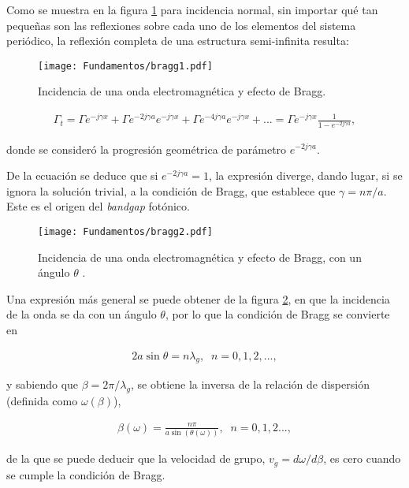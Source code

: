Como se muestra en la figura \ref{fig:bragg-dibujo} para incidencia normal, sin importar qué tan pequeñas son las reflexiones sobre cada uno de los elementos del sistema periódico, la reflexión completa de una estructura semi-infinita resulta:

\begin{figure}[htp]
	\centering
	\texttt{[image: Fundamentos/bragg1.pdf]}
	\caption{Incidencia de una onda electromagnética y efecto de Bragg.}
	\label{fig:bragg-dibujo}
\end{figure}

\begin{align}
	\Gamma_t = \Gamma e^{-j\gamma x} + \Gamma e^{-2j\gamma a} e^{-j\gamma x} + \Gamma e^{-4j\gamma a} e^{-j\gamma x} + ... = \Gamma e^{-j\gamma x} \frac{1}{1-e^{-2j\gamma a}},
\end{align}

donde se consideró la progresión geométrica de parámetro $e^{-2j\gamma a}$.

De la ecuación se deduce que si $e^{-2j\gamma a} = 1$, la expresión diverge, dando lugar, si se ignora la solución trivial, a la condición de Bragg, que establece que $\gamma = n\pi/a$. Este es el origen del \textit{bandgap} fotónico.

\begin{figure}[htp]
	\centering
	\texttt{[image: Fundamentos/bragg2.pdf]}
	\caption{Incidencia de una onda electromagnética y efecto de Bragg, con un ángulo $\theta$ \cite{Caloz:ElectromagneticMetamaterials}.}
	\label{fig:bragg2}
\end{figure}

Una expresión más general se puede obtener de la figura \ref{fig:bragg2}, en que la incidencia de la onda se da con un ángulo $\theta$, por lo que la condición de Bragg se convierte en

\begin{align}
	2 a \sin\theta = n \lambda_g, \;\; n=0, 1, 2, ...,
\end{align}

y sabiendo que $\beta = 2\pi/\lambda_g$, se obtiene la inversa de la relación de dispersión (definida como $\omega(\beta)$),

\begin{align}
	\beta(\omega) = \frac{n\pi}{a \sin(\theta(\omega))}, \;\; n=0, 1, 2...,
\end{align}

de la que se puede deducir que la velocidad de grupo, $v_g = d\omega/d\beta$, es cero cuando se cumple la condición de Bragg.

